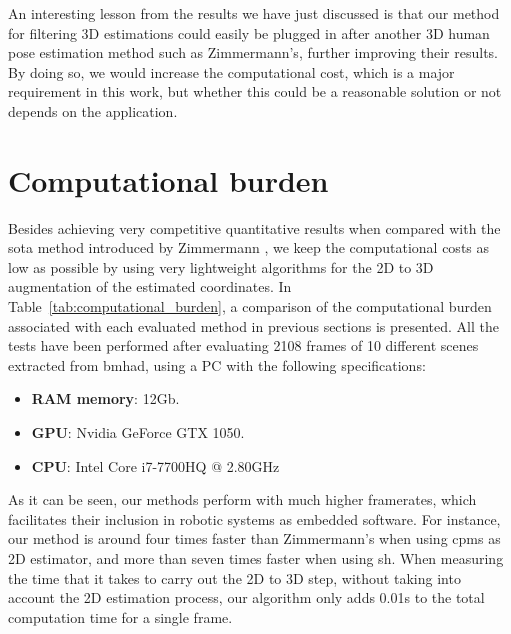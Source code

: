 An interesting lesson from the results we have just discussed is that our method for filtering 3D estimations could easily be plugged in after another 3D human pose estimation method such as Zimmermann's, further improving their results. By doing so, we would increase the computational cost, which is a major requirement in this work, but whether this could be a reasonable solution or not depends on the application.

\section{Computational burden}\label{sec:computational_burden}
Besides achieving very competitive quantitative results when compared with the \gls{sota} method introduced by Zimmermann \etal\cite{Zimmermann2018-sn}, we keep the computational costs as low as possible by using very lightweight algorithms for the 2D to 3D augmentation of the estimated coordinates. In Table~\ref{tab:computational_burden}, a comparison of the computational burden associated with each evaluated method in previous sections is presented. All the tests have been performed after evaluating 2108 frames of 10 different scenes extracted from \gls{bmhad}, using a PC with the following specifications:

\begin{itemize}
    \item \textbf{RAM memory}: 12Gb.
    \item \textbf{GPU}: Nvidia GeForce GTX 1050.
    \item \textbf{CPU}: Intel Core i7-7700HQ @ 2.80GHz
\end{itemize}

\begin{table}[!ht]  
  \centering
  \caption{Computational cost of each method, measured as the average number of frames per second.}
  \label{tab:computational_burden}
\end{table}

As it can be seen, our methods perform with much higher framerates, which facilitates their inclusion in robotic systems as embedded software. For instance, our method is around four times faster than Zimmermann's when using \glspl{cpm} as 2D estimator, and more than seven times faster when using \gls{sh}. When measuring the time that it takes to carry out the 2D to 3D step, without taking into account the 2D estimation process, our algorithm only adds 0.01s to the total computation time for a single frame.

